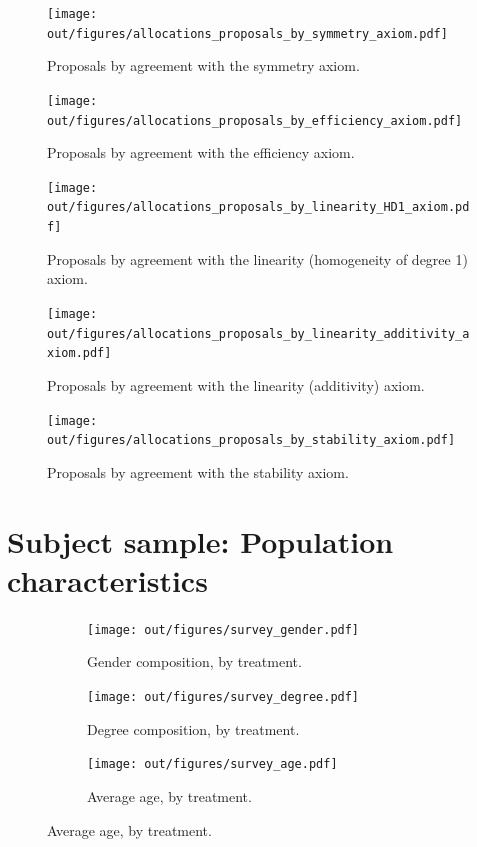 \begin{figure}
    \centering
    \texttt{[image: out/figures/allocations\_proposals\_by\_symmetry\_axiom.pdf]}
    \caption{Proposals by agreement with the symmetry axiom.}
    \label{fig:axioms_proposals_symmetry}
\end{figure}

\begin{figure}
    \centering
    \texttt{[image: out/figures/allocations\_proposals\_by\_efficiency\_axiom.pdf]}
    \caption{Proposals by agreement with the efficiency axiom.}
    \label{fig:axioms_proposals_efficiency}
\end{figure}

\begin{figure}
    \centering
    \texttt{[image: out/figures/allocations\_proposals\_by\_linearity\_HD1\_axiom.pdf]}
    \caption{Proposals by agreement with the linearity (homogeneity of degree 1) axiom.}
    \label{fig:axioms_proposals_linearity_HD1}
\end{figure}

\begin{figure}
    \centering
    \texttt{[image: out/figures/allocations\_proposals\_by\_linearity\_additivity\_axiom.pdf]}
    \caption{Proposals by agreement with the linearity (additivity) axiom.}
    \label{fig:axioms_proposals_linearity_additivity}
\end{figure}

\begin{figure}
    \centering
    \texttt{[image: out/figures/allocations\_proposals\_by\_stability\_axiom.pdf]}
    \caption{Proposals by agreement with the stability axiom.}
    \label{fig:axioms_proposals_stability}
\end{figure}

\section{Subject sample: Population characteristics} 

\begin{figure}[!h]
    \begin{subfigure}[b]{0.49\textwidth}
        \centering
        \texttt{[image: out/figures/survey\_gender.pdf]}
        \caption{Gender composition, by treatment.}
        \label{fig:balance_gender}
    \end{subfigure}
    \hfill
    \begin{subfigure}[b]{0.49\textwidth}
        \centering
        \texttt{[image: out/figures/survey\_degree.pdf]}
        \caption{Degree composition, by treatment.}
        \label{fig:balance_degree}
    \end{subfigure}
    \vfill
    \begin{subfigure}[b]{0.43\textwidth}
         \centering
        \texttt{[image: out/figures/survey\_age.pdf]}
        \caption{Average age, by treatment.}
        \label{fig:balance_age}
    \end{subfigure}
    \label{fig:balance}
\end{figure}

